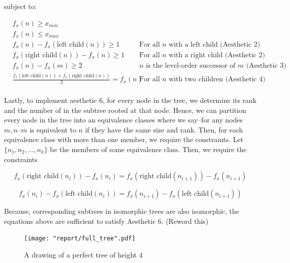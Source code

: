 \documentclass[11pt]{report}
\newcommand{\leftc}[1]{\text{left child}\left(#1\right)}
\newcommand{\rightc}[1]{\text{right child}\left(#1\right)}
\begin{document}
subject to:

\[
\begin{aligned}
    &f_x(n) \geq x_{min} \\
    &f_x(n) \leq x_{max} \\
    &f_x(n) - f_x( \leftc{n} ) \geq 1 &\text{For all $n$ with a left child (Aesthetic 2)} \\
    &f_x( \rightc{n} ) - f_x(n) \geq 1 &\text{For all $n$ with a right child (Aesthetic 2)} \\
    &f_x(n) - f_x(m) \geq 2 &\text{$n$ is the level-order successor of $m$ (Aesthetic 3)} \\
    &\frac{ f_x(\leftc{n}) + f_x(\rightc{n}) }{2} = f_x(n)
         &\text{For all $n$ with two children (Aesthetic 4)} \\
\end{aligned}
\]

Lastly, to implement aesthetic 6, for every node in the tree, we determine its rank and the number of in the subtree rooted at that node. Hence, we can partition every node in the tree into an equivalence classes where we say--for any nodes $m, n$--$m$ is equivalent to $n$ if they have the same size and rank. Then, for each equivalence class with more than one member, we require the constraints. Let $\{ n_1, n_2, ..., n_k \}$ be the members of some equivalence class. Then, we require the constraints

\begin{equation}
    f_x( \rightc{n_i} ) - f_x(n_i) = f_x( \rightc{n_{i + 1}} ) - f_x( n_{i + 1} )
\end{equation}

\begin{equation}
    f_x( n_i ) - f_x( \leftc{n_i} ) = f_x( n_{i + 1} ) - f_x( \leftc{n_{i+1}} )
\end{equation}

Because, corresponding subtrees in isomorphic trees are also isomorphic, the equations above are sufficient to satisfy Aesthetic 6. (Reword this)

\begin{figure}[H]
    \centering
    \texttt{[image: "report/full\_tree".pdf]}
    \caption{A drawing of a perfect tree of height 4}
\end{figure}
\end{document}
